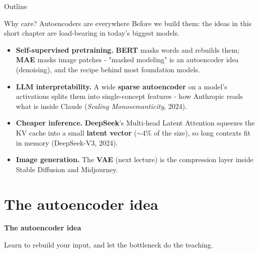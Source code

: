 \documentclass[aspectratio=169]{beamer}
\begin{document}
\begin{frame}{Outline}
  \tableofcontents
\end{frame}

\begin{frame}{Why care? Autoencoders are everywhere}
  \small
  Before we build them: the ideas in this short chapter are load-bearing in today's biggest models.
  \vskip 3pt
  \begin{itemize}
    \item \textbf{Self-supervised pretraining.} \textbf{BERT} masks words and rebuilds them;
      \textbf{MAE} masks image patches - "masked modeling" is an autoencoder idea (denoising), and
      the recipe behind most foundation models.
    \item \textbf{LLM interpretability.} A wide \textbf{sparse autoencoder} on a model's activations
      splits them into single-concept features - how Anthropic reads what is inside Claude
      (\emph{Scaling Monosemanticity}, 2024).
    \item \textbf{Cheaper inference.} \textbf{DeepSeek}'s Multi-head Latent Attention squeezes the KV
      cache into a small \textbf{latent vector} ($\sim$4\% of the size), so long contexts fit in
      memory (DeepSeek-V3, 2024).
    \item \textbf{Image generation.} The \textbf{VAE} (next lecture) is the compression layer inside
      Stable Diffusion and Midjourney.
  \end{itemize}
  \vskip 3pt
\end{frame}

\section{The autoencoder idea}

\begin{frame}[plain]
  \vfill
  \begin{center}
    {\Large\color{popblue}\textbf{The autoencoder idea}}\\[0.9em]
    \begin{minipage}{0.82\textwidth}\centering\small
      Learn to rebuild your input, and let the bottleneck do the teaching.
    \end{minipage}
  \end{center}
  \vfill
\end{frame}
\end{document}
